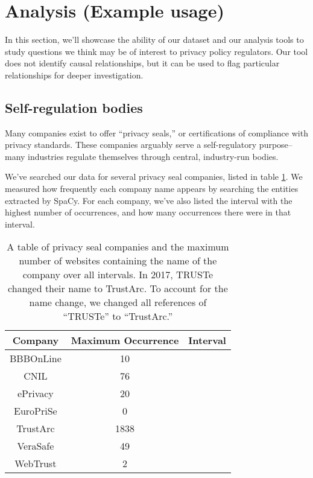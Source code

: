 \section{Analysis (Example usage)}
\label{sec:analysis}

In this section, we'll showcase the ability of our dataset and our analysis tools to study questions we think may be of interest to privacy policy regulators. Our tool does not identify causal relationships, but it can be used to flag particular relationships for deeper investigation.

\subsection{Self-regulation bodies}
Many companies exist to offer ``privacy seals,'' or certifications of compliance with privacy standards. These companies arguably serve a self-regulatory purpose--many industries regulate themselves through central, industry-run bodies.

We've searched our data for several privacy seal companies, listed in table \ref{tbl:sealcomps}. We measured how frequently each company name appears by searching the entities extracted by SpaCy. For each company, we've also listed the interval with the highest number of occurrences, and how many occurrences there were in that interval.

\begin{table}
\begin{tabular}{c|c|c} 
    Company & Maximum Occurrence & Interval\\
    \hline
    BBBOnLine & 10 & ~\\
    CNIL & 76 & ~\\
    ePrivacy & 20 & ~\\
    EuroPriSe & 0 & ~\\
    TrustArc & 1838 & ~\\
    VeraSafe & 49 & ~\\
    WebTrust & 2 & ~\\
\end{tabular}\label{tbl:sealcomps} 
\caption{A table of privacy seal companies and the maximum number of websites containing the name of the company over all intervals. In 2017, TRUSTe changed their name to TrustArc\cite{trustetrustarc}. To account for the name change, we changed all references of ``TRUSTe'' to ``TrustArc.''}
\end{table}

